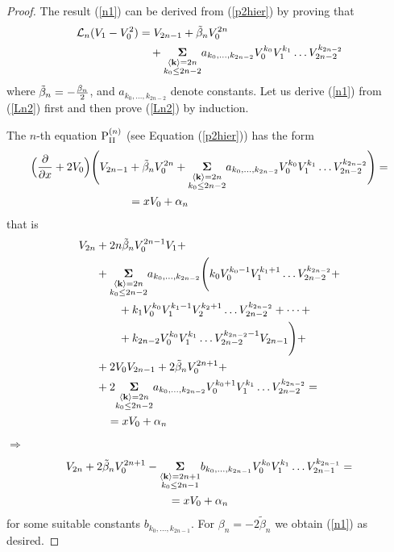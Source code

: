 \documentclass{amsart}
\theoremstyle{definition}
\theoremstyle{remark}
\theoremstyle{remark}
\begin{document}
\begin{proof}
The result (\ref{n1}) can be derived from (\ref{p2hier}) by proving that
\begin{equation}\begin{split}
{\mathcal L}_{n}(V_1-V_0^2) &= V_{2 n-1}+ \tilde\beta_n V_0^{2n}\\
&\quad +
\underset{{\overset{
\scriptstyle \langle{\bf k}\rangle=2n}{\scriptstyle k_0\leq 2n-2}}}
{{\boldsymbol{\Sigma}}}
a_{k_0,\dots,k_{2n-2}} V_0^{k_0}V_1^{k_1}\dots
V_{2n-2}^{k_{2n-2}}
\label{Ln2}
\end{split}
\end{equation}
where  $\tilde\beta_{n}=-{\beta_n\over2}$, and $a_{k_0,\dots,k_{2n-2}}$
denote constants.
Let us derive (\ref{n1}) from (\ref{Ln2}) first and then prove
(\ref{Ln2}) by induction.

The $n$-th equation ${\rm P}^{(n)}_{\rm{\scriptstyle II}}$ (see Equation (\ref{p2hier})) has the form
\begin{equation*}\begin{split}
\Bigl({\partial\over\partial x}+2 V_0\Bigr)\Bigg(V_{2 n-1}&+
\tilde\beta_n V_0^{2n}+\underset{{\overset{
\scriptstyle \langle{\bf k}\rangle=2n}{\scriptstyle k_0\leq 2n-2}}}
{{\boldsymbol{\Sigma}}}
a_{k_0,\dots,k_{2n-2}} V_0^{k_0} V_1^{k_1}\dots
V_{2n-2}^{k_{2n-2}}\Bigg)=\\
&=x V_0+\alpha_n
\end{split}
\end{equation*}
that is
\begin{equation*}
\begin{split}
{V}_{2 n}&+ 2n\tilde\beta_n V_0^{2n-1}V_1+ \\
&+\underset{{\overset{
\scriptstyle \langle{\bf k}\rangle=2n}{\scriptstyle k_0\leq 2n-2}}}
{{\boldsymbol{\Sigma}}}
a_{k_0,\dots,k_{2n-2}}\Biggl(k_0 V_0^{k_0-1} V_1^{k_1+1}\dots
V_{2n-2}^{k_{2n-2}}+\\
&\qquad+k_1 V_0^{k_0} V_1^{k_1-1}V_2^{k_2+1}\dots
V_{2n-2}^{k_{2n-2}}+
\dots+\\
&\qquad+k_{2n-2} V_0^{k_0} V_1^{k_1}\dots
V_{2n-2}^{k_{2n-2}-1}V_{2n-1} \Biggr)+\\
&+ 2 V_0 V_{2 n-1}+2 \tilde\beta_n V_0^{2n+1}+\\
&+2\underset{{\overset{
\scriptstyle \langle{\bf k}\rangle=2n}{\scriptstyle k_0\leq 2n-2}}}
{{\boldsymbol{\Sigma}}}
a_{k_0,\dots,k_{2n-2}} V_0^{k_0+1} V_1^{k_1}\dots
V_{2n-2}^{k_{2n-2}}=\\
&\quad = x V_0+\alpha_n
\end{split}
\end{equation*}
$\Rightarrow$
\begin{equation*}
\begin{split}
V_{2 n}+ 2 \tilde\beta_n V_0^{2n+1}&-
\underset{{\overset{
\scriptstyle \langle{\bf k}\rangle=2n+1}{\scriptstyle k_0\leq 2n-1}}}
{{\boldsymbol{\Sigma}}}
b_{k_0,\dots,k_{2n-1}} V_0^{k_0} V_1^{k_1}\dots
V_{2n-1}^{k_{2n-1}}=\\
&\qquad =x V_0+\alpha_n
\end{split}
\end{equation*}
for some suitable constants $b_{k_0,\dots,k_{2n-1}}$. For
$\beta_n=-2\tilde\beta_n$ we obtain (\ref{n1}) as desired.


\end{proof}
\end{document}

